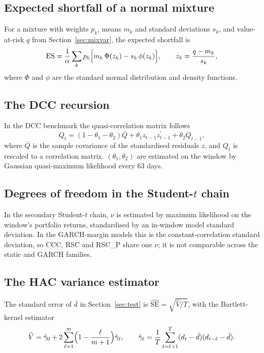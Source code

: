 \subsection{Expected shortfall of a normal mixture}

For a mixture with weights $p_k$, means $m_k$ and standard deviations $s_k$, and value-at-risk $q$ from Section~\ref{sec:mixvar}, the expected shortfall is
\begin{equation}
\mathrm{ES}=\frac1\alpha\sum_k p_k\Bigl[m_k\,\Phi(z_k)-s_k\,\phi(z_k)\Bigr],\qquad z_k=\frac{q-m_k}{s_k},
\end{equation}
where $\Phi$ and $\phi$ are the standard normal distribution and density functions.

\subsection{The DCC recursion}

In the DCC benchmark the quasi-correlation matrix follows
\begin{equation}
Q_t=(1-\theta_1-\theta_2)\bar Q+\theta_1 z_{t-1}z_{t-1}^\prime+\theta_2 Q_{t-1},
\end{equation}
where $\bar Q$ is the sample covariance of the standardised residuals $z$, and $Q_t$ is rescaled to a correlation matrix. $(\theta_1,\theta_2)$ are estimated on the window by Gaussian quasi-maximum likelihood every 63 days.

\subsection{Degrees of freedom in the Student-$t$ chain}

In the secondary Student-$t$ chain, $\nu$ is estimated by maximum likelihood on the window's portfolio returns, standardised by an in-window model standard deviation. In the GARCH-margin models this is the constant-correlation standard deviation, so CCC, RSC and RSC\_P share one $\nu$; it is not comparable across the static and GARCH families.

\subsection{The HAC variance estimator}

The standard error of $\bar d$ in Section~\ref{sec:test} is $\widehat{\mathrm{SE}}=\sqrt{\widehat V/T}$, with the Bartlett-kernel estimator
\begin{equation}
\widehat{V}=\hat\gamma_0+2\sum_{\ell=1}^{m}\Bigl(1-\frac{\ell}{m+1}\Bigr)\hat\gamma_\ell,\qquad
\hat\gamma_\ell=\frac1T\sum_{t=\ell+1}^{T}(d_t-\bar d)(d_{t-\ell}-\bar d).
\end{equation}

